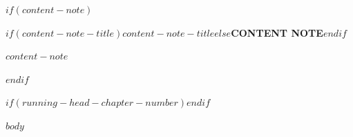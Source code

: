 $if(content-note)$
    \pagestyle{empty}
    \cleardoublepage
    \vspace*{\fill}
    \begin{center}
    \begin{minipage}{0.75\textwidth}
      \centering
      \setlength{\parindent}{0pt}
      \setlength{\parskip}{6pt}
      {\chapterheadingfont\bfseries\large{}\MakeTextUppercase{$if(content-note-title)$$content-note-title$$else$Content Note$endif$}\par}
      \vspace{12pt}
      \primaryfont\normalsize $content-note$\par
    \end{minipage}
    \end{center}
    \vspace*{\fill}
    \clearpage
$endif$

\makeatletter
\pagestyle{fancy}
\newif\ifrunningheadchapternumber
$if(running-head-chapter-number)$\runningheadchapternumbertrue$endif$
\renewcommand{\chaptermark}[1]{\markboth{\if\relax\detokenize{#1}\relax\@chapapp\ \chapternumber\else\ifrunningheadchapternumber\@chapapp\ \chapternumber\ --\ \fi{#1}\fi}{}}

\fancyhf{} %
\ifx\pagenumberposition\bottomcenter
  \fancyfoot[C]{\primaryfont \thepage}
\else\ifx\pagenumberposition\bottomouter
  \fancyfoot[RO,LE]{\primaryfont \thepage}
\else
  \fancyhead[RO,LE]{\fpheadpagenumber} %
\fi\fi
\fancyhead[LO]{\fprunninghead{\fp@rectohead}}
\fancyhead[RE]{\fprunninghead{\fp@versohead}}
\renewcommand{\headrulewidth}{0.0pt} 
\makeatother

\mainmatter

\primaryfont \normalsize \flushbottom $body$


